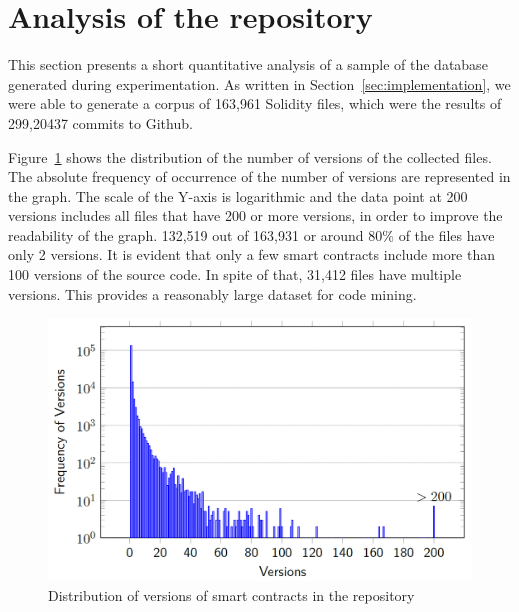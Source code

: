 \documentclass[10pt,conference]{IEEEtran}
\begin{document}
	\section{Analysis of the repository}
	This section presents a short quantitative analysis of a sample of the database generated during experimentation. As written in Section~\ref{sec:implementation}, we were able to generate a corpus of 163,961 Solidity files, which were the results of 299,20437 commits to Github.
	
	Figure~\ref{fig:versions} shows the distribution of the number of versions of the collected files. The absolute frequency of occurrence of the number of versions are represented in the graph. The scale of the Y-axis is logarithmic and the data point at 200 versions includes all files that have 200 or more versions, in order to improve the readability of the graph. 132,519 out of 163,931 or around 80\% of the files have only 2 versions. It is evident that only a few smart contracts include more than 100 versions of the source code. In spite of that, 31,412 files have multiple versions. This provides a reasonably large dataset for code mining.
	
	\begin{figure}[!h]
		\centering
		\includegraphics[scale=0.3]{distr_versions_contracts.png}
		\caption{Distribution of versions of smart contracts in the repository}
		\label{fig:versions}
	\end{figure}
	
\end{document}

